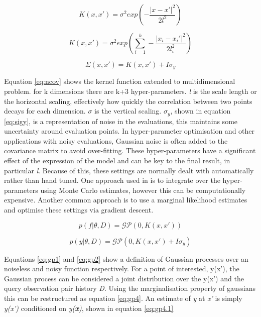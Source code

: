 \documentclass{article}
\begin{document}
			\begin{equation} \label{eq:sek} K(x,x') = \sigma^2 exp\left(-\frac{\mathopen|x - x'\mathclose|^2}{2l^2}\right)\end{equation}

			\begin{equation} \label{eq:ncov} K(x,x') = \sigma^2 exp\left(\sum_{i=1}^k-\frac{\mathopen|x_i - x_i'\mathclose|^2}{2l_i^2}\right)\end{equation}

			\begin{equation}\label{eq:sigy} \Sigma(x,x') = K(x,x') + I \sigma_y \end{equation}


			 Equation \ref{eq:ncov} shows the kernel function extended to multidimensional problem. for k dimensions there are k+3 hyper-parameters. \textit{l} is the scale length or the horizontal scaling, effectively how quickly the correlation between two points decays for each dimension. \(\sigma\) is the vertical scaling. \(\sigma_y\), shown in equation \ref{eq:sigy}, is a representation of noise in the evaluations, this maintains some uncertainty around evaluation points.  In hyper-parameter optimisation and other applications with noisy evaluations, Gaussian noise is often added to the covariance matrix to avoid over-fitting. These hyper-parameters have a significant effect of the expression of the model and can be key to the final result, in particular \textit{l}. Because of this, these settings are normally dealt with automatically rather than hand tuned. One approach used in \cite{17} is to integrate over the hyper-parameters using Monte Carlo estimates, however this can be computationally expensive. Another common approach is to use a marginal likelihood estimates and optimise these settings via gradient descent.

 


			\begin{equation}\label{eq:gp1} p(f|\theta,D) = \mathcal{GP}(0,K(x,x'))\end{equation}

			\begin{equation}\label{eq:gp2} p(y|\theta,D) = \mathcal{GP}(0,K(x,x') + I\sigma_y)\end{equation}


 			Equations \ref{eq:gp1} and \ref{eq:gp2} show a definition of Gaussian processes over an noiseless and noisy function respectively. For a point of interested, y(x'), the Gaussian process can be considered a joint distribution over the y(x') and the query observation pair history \textit{D}. Using the marginalisation property of gaussians this can be restructured as equation \ref{eq:gp4}. An estimate of \textit{y} at \textit{x'} is simply \textit{y(x')} conditioned on \textit{y(\textbf{x})}, shown in equation \ref{eq:gp4.1}
\end{document}
